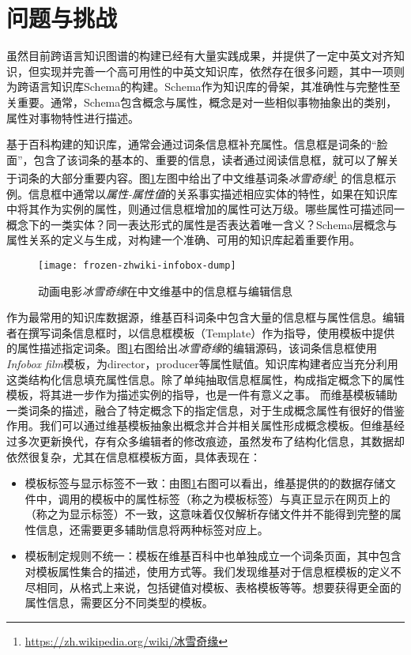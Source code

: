 \section{问题与挑战}

虽然目前跨语言知识图谱的构建已经有大量实践成果，并提供了一定中英文对齐知识，但实现并完善一个高可用性的中英文知识库，依然存在很多问题，其中一项则为跨语言知识库Schema的构建。Schema作为知识库的骨架，其准确性与完整性至关重要。通常，Schema包含概念与属性，概念是对一些相似事物抽象出的类别，属性对事物特性进行描述。

基于百科构建的知识库，通常会通过词条信息框补充属性。信息框是词条的“脸面”，包含了该词条的基本的、重要的信息，读者通过阅读信息框，就可以了解关于词条的大部分重要内容。图\ref{fig:frozen-zhwiki-infobox-dump}左图中给出了中文维基词条\textit{冰雪奇缘}\footnote{\url{https://zh.wikipedia.org/wiki/冰雪奇缘}} 的信息框示例。信息框中通常以\textit{属性-属性值}的关系事实描述相应实体的特性，如果在知识库中将其作为实例的属性，则通过信息框增加的属性可达万级。哪些属性可描述同一概念下的一类实体？同一表达形式的属性是否表达着唯一含义？Schema层概念与属性关系的定义与生成，对构建一个准确、可用的知识库起着重要作用。

\begin{figure}[h]
  \centering
  \texttt{[image: frozen-zhwiki-infobox-dump]}
  \caption{动画电影\textit{冰雪奇缘}在中文维基中的信息框与编辑信息}
  \label{fig:frozen-zhwiki-infobox-dump}
\end{figure}

作为最常用的知识库数据源，维基百科词条中包含大量的信息框与属性信息。编辑者在撰写词条信息框时，以信息框模板（Template）作为指导，使用模板中提供的属性描述指定词条。图\ref{fig:frozen-zhwiki-infobox-dump}右图给出\textit{冰雪奇缘}的编辑源码，该词条信息框使用\textit{Infobox film}模板，为director，producer等属性赋值。知识库构建者应当充分利用这类结构化信息填充属性信息。除了单纯抽取信息框属性，构成指定概念下的属性模板，将其进一步作为描述实例的指导，也是一件有意义之事。
而维基模板辅助一类词条的描述，融合了特定概念下的指定信息，对于生成概念属性有很好的借鉴作用。我们可以通过维基模板抽象出概念并合并相关属性形成概念模板。但维基经过多次更新换代，存有众多编辑者的修改痕迹，虽然发布了结构化信息，其数据却依然很复杂，尤其在信息框模板方面，具体表现在：
\begin{itemize}
\item {\heiti 模板标签与显示标签不一致}：由图\ref{fig:frozen-zhwiki-infobox-dump}右图可以看出，维基提供的的数据存储文件中，调用的模板中的属性标签（称之为模板标签）与真正显示在网页上的（称之为显示标签）不一致，这意味着仅仅解析存储文件并不能得到完整的属性信息，还需要更多辅助信息将两种标签对应上。
\item {\heiti 模板制定规则不统一}：模板在维基百科中也单独成立一个词条页面，其中包含对模板属性集合的描述，使用方式等。我们发现维基对于信息框模板的定义不尽相同，从格式上来说，包括键值对模板、表格模板等等。想要获得更全面的属性信息，需要区分不同类型的模板。
\end{itemize}

